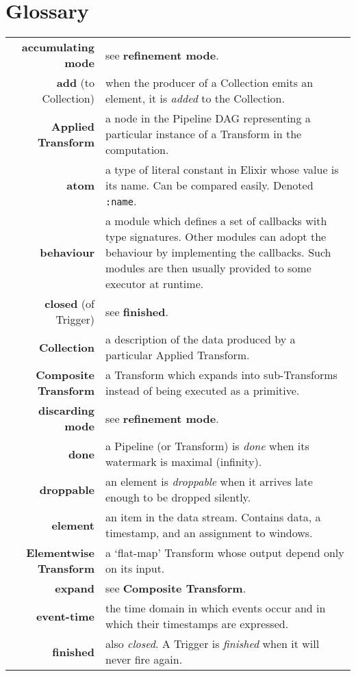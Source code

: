\chapter{Glossary}\label{apx:glossary}
{\small\tabulinesep=0.5mm
\begin{longtabu}{rX[p]}
	\textbf{accumulating mode} & see \textbf{refinement mode}. \\
	\textbf{add} (to Collection) & when the producer of a Collection emits an element, it is \emph{added} to the Collection. \\
	\textbf{Applied Transform} & a node in the Pipeline DAG representing a particular instance of a Transform in the computation. \\
	\textbf{atom} & a type of literal constant in Elixir whose value is its name. Can be compared easily. Denoted \texttt{:name}. \\
	\textbf{behaviour} & a module which defines a set of callbacks with type signatures. Other modules can adopt the behaviour by implementing the callbacks. Such modules are then usually provided to some executor at runtime. \\
	\textbf{closed} (of Trigger) & see \textbf{finished}. \\
	\textbf{Collection} & a description of the data produced by a particular Applied Transform. \\
	\textbf{Composite Transform} & a Transform which expands into sub-Transforms instead of being executed as a primitive. \\
	\textbf{discarding mode} & see \textbf{refinement mode}. \\
	\textbf{done} & a Pipeline (or Transform) is \emph{done} when its watermark is maximal (infinity). \\
	\textbf{droppable} & an element is \emph{droppable} when it arrives late enough to be dropped silently. \\
	\textbf{element} & an item in the data stream. Contains data, a timestamp, and an assignment to windows. \\
	\textbf{Elementwise Transform} & a `flat-map' Transform whose output depend only on its input. \\
	\textbf{expand} & see \textbf{Composite Transform}. \\
	\textbf{event-time} & the time domain in which events occur and in which their timestamps are expressed. \\
	\textbf{finished} & also \emph{closed}. A Trigger is \emph{finished} when it will never fire again. \\

\end{longtabu}}
